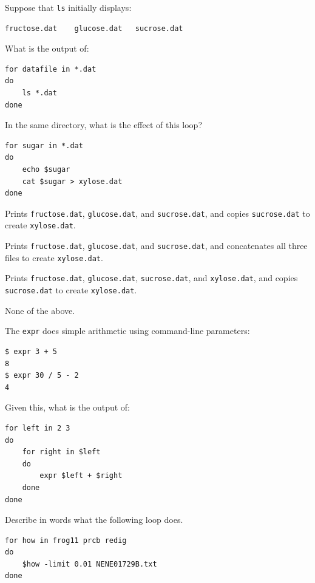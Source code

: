 \documentclass{book}
\begin{document}
\begin{swcenumerate}
\item
  Suppose that \texttt{ls} initially displays:

\begin{verbatim}
fructose.dat    glucose.dat   sucrose.dat
\end{verbatim}

  What is the output of:

\begin{verbatim}
for datafile in *.dat
do
    ls *.dat
done
\end{verbatim}
\item
  In the same directory, what is the effect of this loop?

\begin{verbatim}
for sugar in *.dat
do
    echo $sugar
    cat $sugar > xylose.dat
done
\end{verbatim}

  \begin{swcenumerate2}
  \item
    Prints \texttt{fructose.dat}, \texttt{glucose.dat}, and
    \texttt{sucrose.dat}, and copies \texttt{sucrose.dat} to create
    \texttt{xylose.dat}.
  \item
    Prints \texttt{fructose.dat}, \texttt{glucose.dat}, and
    \texttt{sucrose.dat}, and concatenates all three files to create
    \texttt{xylose.dat}.
  \item
    Prints \texttt{fructose.dat}, \texttt{glucose.dat},
    \texttt{sucrose.dat}, and \texttt{xylose.dat}, and copies
    \texttt{sucrose.dat} to create \texttt{xylose.dat}.
  \item
    None of the above.
  \end{swcenumerate2}
\item
  The \texttt{expr} does simple arithmetic using command-line
  parameters:

\begin{verbatim}
$ expr 3 + 5
8
$ expr 30 / 5 - 2
4
\end{verbatim}

  Given this, what is the output of:

\begin{verbatim}
for left in 2 3
do
    for right in $left
    do
        expr $left + $right
    done
done
\end{verbatim}
\item
  Describe in words what the following loop does.

\begin{verbatim}
for how in frog11 prcb redig
do
    $how -limit 0.01 NENE01729B.txt
done
\end{verbatim}
\end{swcenumerate}
\end{document}
